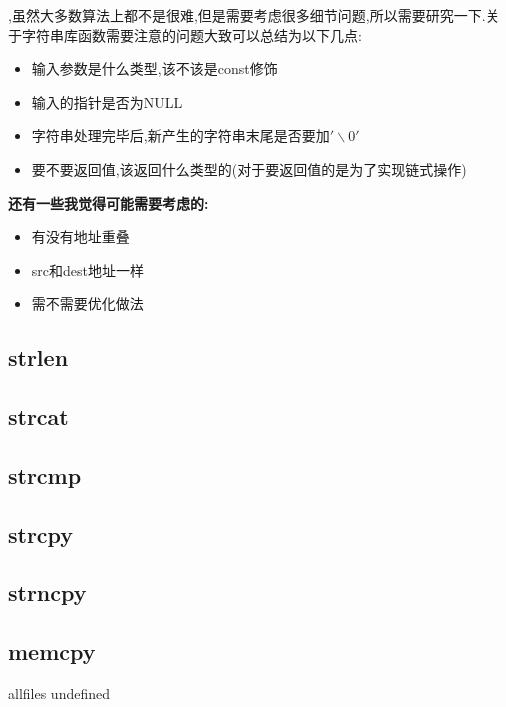 \documentclass{article}
\begin{document}
\begin{CJK}{UTF8}{gbsn}     %

\else
    
,虽然大多数算法上都不是很难,但是需要考虑很多细节问题,所以需要研究一下.关于字符串库函数需要注意的问题大致可以总结为以下几点:

\begin{itemize}
\item 输入参数是什么类型,该不该是const修饰
\item 输入的指针是否为NULL
\item 字符串处理完毕后,新产生的字符串末尾是否要加$'\backslash0'$
\item 要不要返回值,该返回什么类型的(对于要返回值的是为了实现链式操作)
\end{itemize}

\textbf{还有一些我觉得可能需要考虑的:}

\begin{itemize}
\item 有没有地址重叠
\item src和dest地址一样
\item 需不需要优化做法
\end{itemize}

\subsection{strlen}

\subsection{strcat}

\subsection{strcmp}

\subsection{strcpy}

\subsection{strncpy}

\subsection{memcpy}


\fi

\ifx allfiles undefined
\end{CJK}
\end{document}
